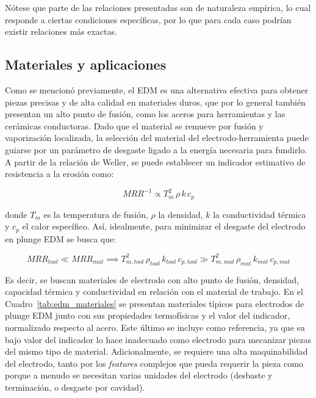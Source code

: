 Nótese que parte de las relaciones presentadas son de naturaleza empírica, lo cual responde a ciertas condiciones específicas, por lo que para cada caso podrían existir relaciones más exactas.

\subsection{Materiales y aplicaciones}

Como se mencionó previamente, el EDM es una alternativa efectiva para obtener piezas precisas y de alta calidad en materiales duros, que por lo general también presentan un alto punto de fusión, como los aceros para herramientas y las cerámicas conductoras. Dado que el material se remueve por fusión y vaporización localizada, la selección del material del electrodo-herramienta puede guiarse por un parámetro de desgaste ligado a la energía necesaria para fundirlo. A partir de la relación de Weller, se puede establecer un indicador estimativo de resistencia a la erosión como:

\begin{equation}
	MRR^{-1} \propto T_{m}^{2}\,\rho\, k\, c_{p}
\end{equation}

donde $T_m$ es la temperatura de fusión, $\rho$ la densidad, $k$ la conductividad térmica y $c_p$ el calor específico. Así, idealmente, para minimizar el desgaste del electrodo en plunge EDM se busca que:

\begin{equation}
	MRR_{tool} \ll MRR_{mat} \implies T_{m,tool}^{2}\,\rho_{tool}\, k_{tool}\, c_{p,tool} \gg T_{m,mat}^{2}\,\rho_{mat}\, k_{mat}\, c_{p,mat}
\end{equation}

Es decir, se buscan materiales de electrodo con alto punto de fusión, densidad, capacidad térmica y conductividad en relación con el material de trabajo. En el Cuadro~\ref{tab:edm_materiales} se presentan materiales típicos para electrodos de plunge EDM junto con sus propiedades termofísicas y el valor del indicador, normalizado respecto al acero. Este último se incluye como referencia, ya que su bajo valor del indicador lo hace inadecuado como electrodo para mecanizar piezas del mismo tipo de material. Adicionalmente, se requiere una alta maquinabilidad del electrodo, tanto por los \textit{features} complejos que pueda requerir la pieza como porque a menudo se necesitan varias unidades del electrodo (desbaste y terminación, o desgaste por cavidad).

